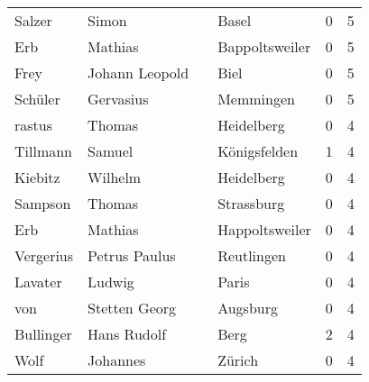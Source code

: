 \begin{tabular}{llllrr}
                   Salzer &                              Simon &             &                                       Basel &          0 &         5 \\
                      Erb &                            Mathias &             &                              Bappoltsweiler &          0 &         5 \\
                     Frey &                     Johann Leopold &             &                                        Biel &          0 &         5 \\
                  Schüler &                          Gervasius &             &                                   Memmingen &          0 &         5 \\
                   rastus &                             Thomas &             &                                  Heidelberg &          0 &         4 \\
                 Tillmann &                             Samuel &             &                                Königsfelden &          1 &         4 \\
                  Kiebitz &                            Wilhelm &             &                                  Heidelberg &          0 &         4 \\
                  Sampson &                             Thomas &             &                                  Strassburg &          0 &         4 \\
                      Erb &                            Mathias &             &                              Happoltsweiler &          0 &         4 \\
                Vergerius &                      Petrus Paulus &             &                                  Reutlingen &          0 &         4 \\
                  Lavater &                             Ludwig &             &                                       Paris &          0 &         4 \\
                      von &                      Stetten Georg &             &                                    Augsburg &          0 &         4 \\
                Bullinger &                        Hans Rudolf &             &                                        Berg &          2 &         4 \\
                     Wolf &                           Johannes &             &                                      Zürich &          0 &         4 \\

\end{tabular}
